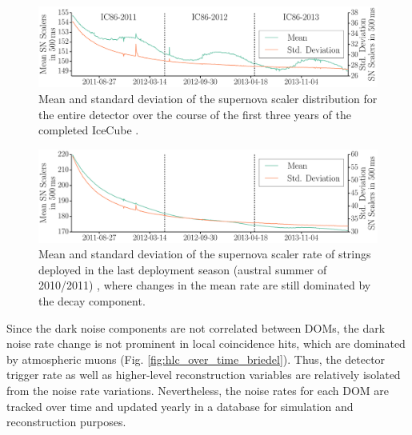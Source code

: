 \begin{figure}[!h]
 \centering
 \includegraphics[width=1.0\textwidth]{graphics/dom/performance/darknoise/SN_Scalers_Whole_Detector_Mean_Variance_IC86_2011_2012_2013_smaller_height.pdf}
 \caption{Mean and standard deviation of the supernova scaler distribution for the
   entire detector over the course of the first three years of the
   completed IceCube \cite{briedel_phd}.} 
 \label{fig:noise_over_time_briedel}
\end{figure}

\begin{figure}[!h]
 \centering
 \includegraphics[width=1.0\textwidth]{graphics/dom/performance/darknoise/SN_Scalers_IC86_mean_variance_Histo_IC86_2011_2012_2013_geomapping.pdf}
 \caption{Mean and standard deviation of the supernova scaler rate of strings
   deployed in the last deployment season (austral summer of 2010/2011)
   \cite{briedel_phd}, where changes in the mean rate are
still dominated by the decay component.} 
 \label{fig:noise_over_time_briedel_lastseasondepoyed}
\end{figure}

Since the dark noise components are not correlated between
DOMs, the dark noise rate change is not prominent in local coincidence
hits, which are dominated by atmospheric muons (Fig.
\ref{fig:hlc_over_time_briedel}).  Thus, the detector trigger rate as well
as higher-level reconstruction variables are relatively isolated from the
noise rate variations.  Nevertheless, the noise rates for each DOM are
tracked over time and updated yearly in a database for simulation and
reconstruction purposes. 

